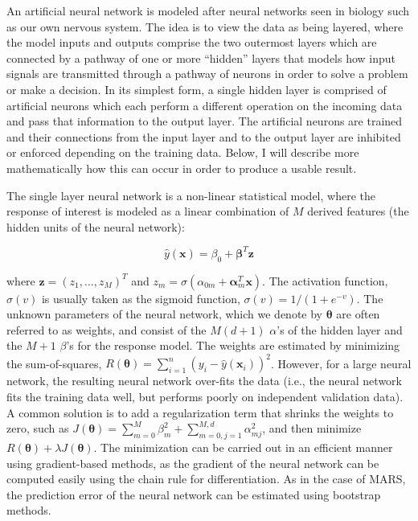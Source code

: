 An artificial neural network is modeled after neural networks seen in biology such as our own nervous system.
%
The idea is to view the data as being layered, where the model inputs and outputs comprise the two outermost layers which are connected by a pathway of one or more ``hidden'' layers that models how input signals are transmitted through a pathway of neurons in order to solve a problem or make a decision.
%
In its simplest form, a single hidden layer is comprised of artificial neurons which each perform a different operation on the incoming data and pass that information to the output layer.
%
The artificial neurons are trained and their connections from the input layer and to the output layer are inhibited or enforced depending on the training data.
%
Below, I will describe more mathematically how this can occur in order to produce a usable result.

The single layer neural network is a non-linear statistical model, where the response of interest is modeled as a linear combination of $M$ derived features (the hidden units of the neural network):

\begin{equation}
\hat{y}(\mathbf{x}) = \beta_0 + \boldsymbol{\beta}^T \mathbf{z}
\end{equation}

where $\mathbf{z} = (z_1, \dots, z_M)^T$ and $z_m = \sigma(\alpha_{0m} + \boldsymbol{\alpha}_m^T \mathbf{x})$.
%
The activation function, $\sigma(v)$ is usually taken as the sigmoid function, $\sigma(v) = 1/(1+e^{-v})$.
%
The unknown parameters of the neural network, which we denote by $\boldsymbol{\theta}$ are often referred to as weights, and consist of the $M(d+1)$ $\alpha$'s of the hidden layer and the $M+1$ $\beta$'s for the response model.
%
The weights are estimated by minimizing the sum-of-squares, $R(\boldsymbol{\theta}) = \sum_{i=1}^n (y_i - \hat{y}(\mathbf{x}_i))^2$.
%
However, for a large neural network, the resulting neural network over-fits the data (i.e., the neural network fits the training data well, but performs poorly on independent validation data).
%
A common solution is to add a regularization term that shrinks the weights to zero, such as $J(\boldsymbol{\theta}) = \sum_{m=0}^M \beta_{m}^2 + \sum_{m=0,j=1}^{M,d} \alpha_{mj}^2$, and then minimize $R(\boldsymbol{\theta}) + \lambda J(\boldsymbol{\theta})$.
%
The minimization can be carried out in an efficient manner using gradient-based methods, as the gradient of the neural network can be computed easily using the chain rule for differentiation.
%
As in the case of MARS, the prediction error of the neural network can be estimated using bootstrap methods.

